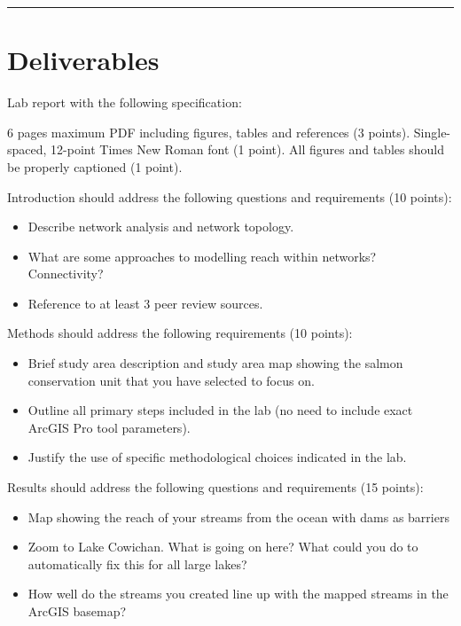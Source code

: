 \documentclass[
]{book}
\begin{document}
\begin{center}\rule{0.5\linewidth}{0.5pt}\end{center}

\hypertarget{lab2-deliverables}{%
\section*{Deliverables}\label{lab2-deliverables}}

Lab report with the following specification:

6 pages maximum PDF including figures, tables and references (3 points). Single-spaced, 12-point Times New Roman font (1 point). All figures and tables should be properly captioned (1 point).

Introduction should address the following questions and requirements (10 points):

\begin{itemize}
\item
  Describe network analysis and network topology.
\item
  What are some approaches to modelling reach within networks? Connectivity?
\item
  Reference to at least 3 peer review sources.
\end{itemize}

Methods should address the following requirements (10 points):

\begin{itemize}
\item
  Brief study area description and study area map showing the salmon conservation unit that you have selected to focus on.
\item
  Outline all primary steps included in the lab (no need to include exact ArcGIS Pro tool parameters).
\item
  Justify the use of specific methodological choices indicated in the lab.
\end{itemize}

Results should address the following questions and requirements (15 points):

\begin{itemize}
\item
  Map showing the reach of your streams from the ocean with dams as barriers
\item
  Zoom to Lake Cowichan. What is going on here? What could you do to automatically fix this for all large lakes?
\item
  How well do the streams you created line up with the mapped streams in the ArcGIS basemap?
\end{itemize}
\end{document}
